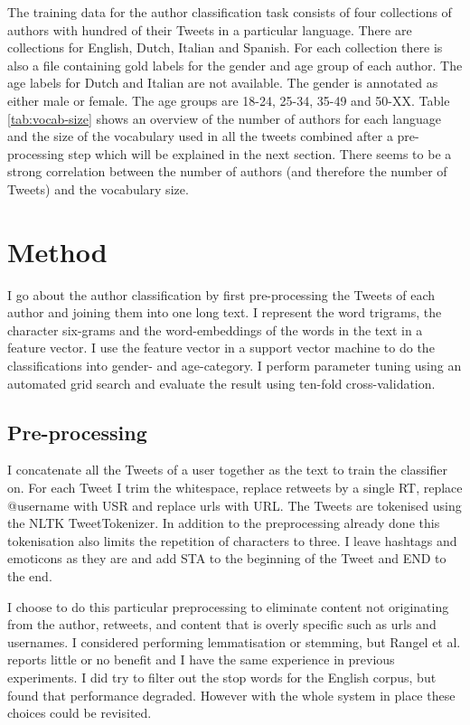\documentclass[11pt]{article}
\begin{document}
The training data for the author classification task consists of four collections of authors with hundred of their Tweets in a particular language. There are collections for English, Dutch, Italian and Spanish. For each collection there is also a file containing gold labels for the gender and age group of each author. The age labels for Dutch and Italian are not available. The gender is annotated as either male or female. The age groups are 18-24, 25-34, 35-49 and 50-XX. Table \ref{tab:vocab-size} shows an overview of the number of authors for each language and the size of the vocabulary used in all the tweets combined after a pre-processing step which will be explained in the next section. There seems to be a strong correlation between the number of authors (and therefore the number of Tweets) and the vocabulary size.

\section{Method}

I go about the author classification by first pre-processing the Tweets of each author and joining them into one long text. I represent the word trigrams, the character six-grams and the word-embeddings of the words in the text in a feature vector. I use the feature vector in a support vector machine to do the classifications into gender- and age-category. I perform parameter tuning using an automated grid search and evaluate the result using ten-fold cross-validation.

\subsection{Pre-processing}

I concatenate all the Tweets of a user together as the text to train the classifier on. For each Tweet I trim the whitespace, replace retweets by a single RT, replace @username with USR and replace urls with URL. The Tweets are tokenised using the NLTK \cite{bird2009natural} TweetTokenizer. In addition to the preprocessing already done this tokenisation also limits the repetition of characters to three. I leave hashtags and emoticons as they are and add STA to the beginning of the Tweet and END to the end.

I choose to do this particular preprocessing to eliminate content not originating from the author, retweets, and content that is overly specific such as urls and usernames. I considered performing lemmatisation or stemming, but Rangel et al.  reports little or no benefit and I have the same experience in previous experiments. I did try to filter out the stop words for the English corpus, but found that performance degraded. However with the whole system in place these choices could be revisited.
\end{document}
